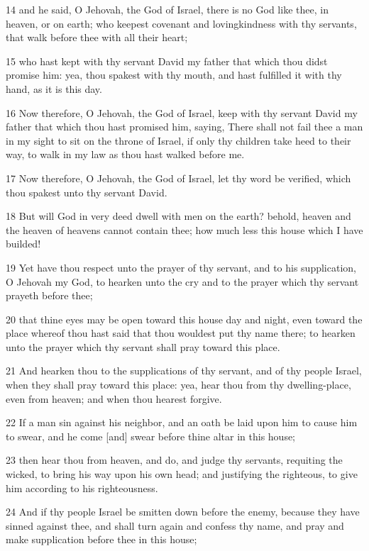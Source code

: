 \par 14 and he said, O Jehovah, the God of Israel, there is no God like thee, in heaven, or on earth; who keepest covenant and lovingkindness with thy servants, that walk before thee with all their heart;
\par 15 who hast kept with thy servant David my father that which thou didst promise him: yea, thou spakest with thy mouth, and hast fulfilled it with thy hand, as it is this day.
\par 16 Now therefore, O Jehovah, the God of Israel, keep with thy servant David my father that which thou hast promised him, saying, There shall not fail thee a man in my sight to sit on the throne of Israel, if only thy children take heed to their way, to walk in my law as thou hast walked before me.
\par 17 Now therefore, O Jehovah, the God of Israel, let thy word be verified, which thou spakest unto thy servant David.
\par 18 But will God in very deed dwell with men on the earth? behold, heaven and the heaven of heavens cannot contain thee; how much less this house which I have builded!
\par 19 Yet have thou respect unto the prayer of thy servant, and to his supplication, O Jehovah my God, to hearken unto the cry and to the prayer which thy servant prayeth before thee;
\par 20 that thine eyes may be open toward this house day and night, even toward the place whereof thou hast said that thou wouldest put thy name there; to hearken unto the prayer which thy servant shall pray toward this place.
\par 21 And hearken thou to the supplications of thy servant, and of thy people Israel, when they shall pray toward this place: yea, hear thou from thy dwelling-place, even from heaven; and when thou hearest forgive.
\par 22 If a man sin against his neighbor, and an oath be laid upon him to cause him to swear, and he come [and] swear before thine altar in this house;
\par 23 then hear thou from heaven, and do, and judge thy servants, requiting the wicked, to bring his way upon his own head; and justifying the righteous, to give him according to his righteousness.
\par 24 And if thy people Israel be smitten down before the enemy, because they have sinned against thee, and shall turn again and confess thy name, and pray and make supplication before thee in this house;
